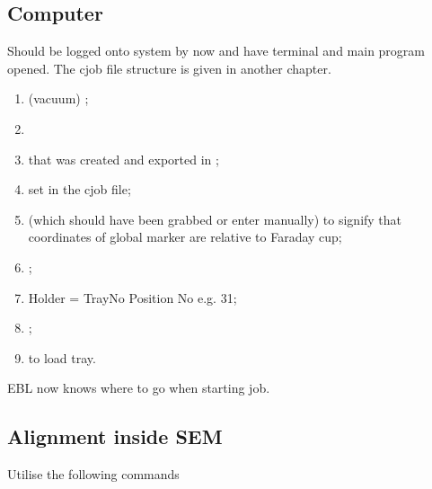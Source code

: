   \subsection{Computer}
   Should be logged onto system by now and have terminal and main program opened. The cjob file structure is given in another chapter.
   
   \begin{enumerate}
   	\item {} \ra {} (vacuum) \ra {};
   	\item {}
   	\item {} that was created and exported in ;
   	\item {} set in the cjob file;
   	\item {} (which should have been grabbed or enter manually)  to signify that coordinates of global marker are relative to Faraday cup;
   	\item {};
   	\item Holder = TrayNo Position No e.g. 31;
   	\item {};
   	\item {} to load tray.
   \end{enumerate}

   EBL now knows where to go when starting job.
 
  \subsection{Alignment inside SEM}
   Utilise the following commands
   

